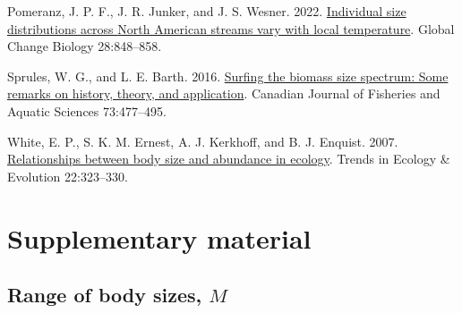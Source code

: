 \documentclass[
]{article}
\newlength{\cslhangindent}
\newlength{\cslentryspacingunit} %
\newenvironment{CSLReferences}[2] %
 {%
  \setlength{\parindent}{0pt}
  \ifodd #1
  \let\oldpar\par
  \def\par{\hangindent=\cslhangindent\oldpar}
  \fi
  \setlength{\parskip}{#2\cslentryspacingunit}
 }%
 {}
\begin{document}
\begin{CSLReferences}{1}{0}
\leavevmode{}%
Pomeranz, J. P. F., J. R. Junker, and J. S. Wesner. 2022.
\href{https://doi.org/10.1111/gcb.15862}{Individual size distributions
across {North American} streams vary with local temperature}. Global
Change Biology 28:848--858.

\leavevmode{}%
Sprules, W. G., and L. E. Barth. 2016.
\href{https://doi.org/10.1139/cjfas-2015-0115}{Surfing the biomass size
spectrum: Some remarks on history, theory, and application}. Canadian
Journal of Fisheries and Aquatic Sciences 73:477--495.

\leavevmode{}%
White, E. P., S. K. M. Ernest, A. J. Kerkhoff, and B. J. Enquist. 2007.
\href{https://doi.org/10.1016/j.tree.2007.03.007}{Relationships between
body size and abundance in ecology}. Trends in Ecology \& Evolution
22:323--330.

\end{CSLReferences}

\newpage

\hypertarget{supplementary-material}{%
\section*{Supplementary material}\label{supplementary-material}}

\setcounter{table}{0} \renewcommand{\thetable}{S\arabic{table}} \setcounter{figure}{0} \renewcommand{\thefigure}{S\arabic{figure}}

\hypertarget{range-of-body-sizes-m}{%
\subsection{\texorpdfstring{Range of body sizes,
\(M\)}{Range of body sizes, M}}\label{range-of-body-sizes-m}}
\end{document}

